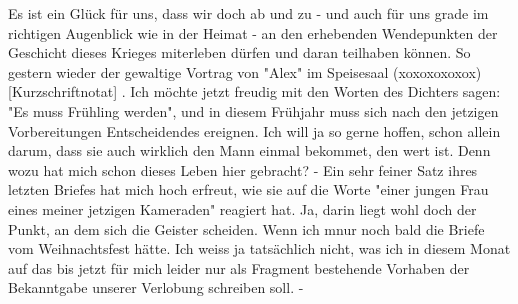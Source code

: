 \def\day{20. Februar 1943}
\mktitle

Es ist ein Gl\"{u}ck f\"{u}r uns, dass wir doch ab und zu - und auch f\"{u}r uns grade im richtigen Augenblick wie in der Heimat - an den erhebenden Wendepunkten der Geschicht dieses Krieges miterleben d\"{u}rfen und daran teilhaben k\"{o}nnen.
So gestern wieder der gewaltige Vortrag von "Alex" im Speisesaal (xoxoxoxoxox){\color{red} [Kurzschriftnotat] }.
Ich m\"{o}chte jetzt freudig  mit den Worten des Dichters sagen: "Es muss Fr\"{u}hling werden", und in diesem Fr\"{u}hjahr muss sich nach den jetzigen Vorbereitungen Entscheidendes ereignen.
Ich will ja so gerne hoffen, schon allein darum, dass sie auch wirklich den Mann einmal bekommet, den wert ist.
Denn wozu hat mich schon dieses Leben hier gebracht?
- Ein sehr feiner Satz ihres letzten Briefes hat mich hoch erfreut, wie sie auf die Worte "einer jungen Frau eines meiner jetzigen Kameraden" reagiert hat.
Ja, darin liegt wohl doch der Punkt, an dem sich die Geister scheiden.
Wenn ich mnur noch bald die Briefe vom Weihnachtsfest h\"{a}tte.
Ich weiss ja tats\"{a}chlich nicht, was ich in diesem Monat auf das bis jetzt f\"{u}r mich leider nur als Fragment bestehende Vorhaben der Bekanntgabe unserer Verlobung schreiben soll. -

\clearpage
